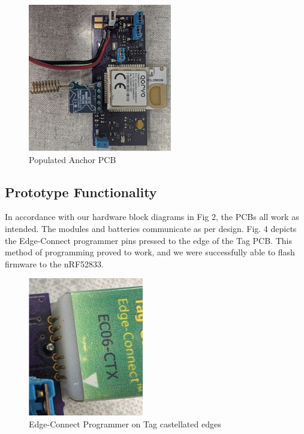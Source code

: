 \documentclass[conference]{IEEEtran}
\begin{document}
\begin{figure}
\begin{center}
\includegraphics[scale=3]{mdr_anchor_picture.png}
\caption{Populated Anchor PCB}
\end{center}
\end{figure}

\subsection{Prototype Functionality}
In accordance with our hardware block diagrams in Fig 2, the PCBs all work 
as intended. The modules and batteries communicate as per design. Fig. 4 
depicts the Edge-Connect programmer pins pressed to the edge of the Tag PCB. 
This method of programming proved to work, and we were successfully able to 
flash firmware to the nRF52833.

\begin{figure}
\begin{center}
\includegraphics[scale=1]{mdr_edge_connect.png}
\caption{Edge-Connect Programmer on Tag castellated edges}
\end{center}
\end{figure}
\end{document}
